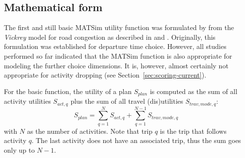 \subsection{Mathematical form}

The first and still basic MATSim utility function was formulated by \citet[][]{CharyparNagel_Transportation_2005} from the \emph{Vickrey} model for road congestion as described in \citet[][]{Vickrey_TAER_1969} and \citet[][]{ArnottEtAl_TAER_1993}. Originally, this formulation was established for departure time choice. However, all studies performed so far indicated that the MATSim function is also appropriate for modeling the further choice dimensions.
%
It is, however, almost certainly not appropriate for activity dropping (see Section~\ref{sec:scoring-current}).




For the basic function, the utility of a plan $S_{plan}$ is computed as the sum of all activity utilities $S_{act,q}$ plus the sum of all travel (dis)utilities $S_{trav,mode, q}$:
%
\begin{equation}
\label{eq:matsimUTF}
S_{plan}=\sum^N_{q=1} S_{act,q} + \sum^{N-1}_{q=1} S_{trav, mode, q}
\end{equation}
with $N$ as the number of activities. Note that trip $q$ is the trip that follows activity $q$. The last activity does not have an associated trip, thus the sum goes only up to $N-1$.  

